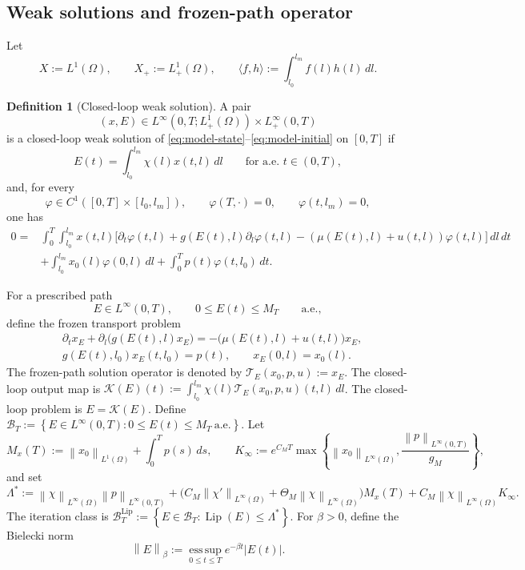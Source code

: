 \documentclass[pdflatex,sn-mathphys-num]{sn-jnl}
\theoremstyle{thmstyleone}
\theoremstyle{definition}
\newtheorem{definition}[theorem]{Definition}
\theoremstyle{remark}
\newcommand{\Om}{\Omega}
\newcommand{\Tcal}{\mathcal{T}}
\newcommand{\Kcal}{\mathcal{K}}
\newcommand{\Bt}{\mathcal{B}_T}
\newcommand{\Btl}{\mathcal{B}_T^{\mathrm{Lip}}}
\newcommand{\Lip}{\operatorname{Lip}}
\newcommand{\norm}[1]{\left\lVert#1\right\rVert}
\newcommand{\abs}[1]{\left\lvert#1\right\rvert}
\numberwithin{equation}{section}
\begin{document}
\subsection{Weak solutions and frozen-path operator}
\label{subsec:model-weak}
Let
\[
X:=L^1(\Om),
\qquad
X_+:=L^1_+(\Om),
\qquad
\langle f,h\rangle:=\int_{l_0}^{l_m}f(l)h(l)\,dl .
\]
\begin{definition}[Closed-loop weak solution]
\label{def:model-weak-solution}
A pair
\[
(x,E)\in L^\infty(0,T;L^1_+(\Omega))\times L^\infty_+(0,T)
\]
is a closed-loop weak solution of
\eqref{eq:model-state}--\eqref{eq:model-initial} on \([0,T]\) if
\[
E(t)=\int_{l_0}^{l_m}\chi(l)x(t,l)\,dl
\qquad\text{for a.e. }t\in(0,T),
\]
and, for every
\[
\varphi\in C^1([0,T]\times[l_0,l_m]),
\qquad
\varphi(T,\cdot)=0,
\qquad
\varphi(t,l_m)=0,
\]
one has
\begin{align}
0={}&
\int_0^T\int_{l_0}^{l_m}
x(t,l)
\Big[
\partial_t\varphi(t,l)
+
g(E(t),l)\partial_l\varphi(t,l)
-
(\mu(E(t),l)+u(t,l))\varphi(t,l)
\Big]\,dl\,dt
\nonumber\\
&+
\int_{l_0}^{l_m}x_0(l)\varphi(0,l)\,dl
+
\int_0^T p(t)\varphi(t,l_0)\,dt .
\label{eq:model-weak-form}
\end{align}
\end{definition}
For a prescribed path
\[
E\in L^\infty(0,T),
\qquad
0\le E(t)\le M_T\qquad\text{a.e.},
\]
define the frozen transport problem
\begin{align}
&\partial_t x_E+\partial_l\big(g(E(t),l)x_E\big)
=
-\big(\mu(E(t),l)+u(t,l)\big)x_E,
\label{eq:model-frozen-state}
\\
&g(E(t),l_0)x_E(t,l_0)=p(t),
\qquad
x_E(0,l)=x_0(l).
\label{eq:model-frozen-bc}
\end{align}
The frozen-path solution operator is denoted by
$\displaystyle \Tcal_E(x_0,p,u):=x_E$.
The closed-loop output map is
$\displaystyle \Kcal(E)(t)
:=
\int_{l_0}^{l_m}\chi(l)\Tcal_E(x_0,p,u)(t,l)\,dl$.
The closed-loop problem is
$\displaystyle  E=\Kcal(E)$.
Define
$\displaystyle \Bt:=
\left\{
E\in L^\infty(0,T):
0\le E(t)\le M_T\ \text{a.e.}
\right\}$.
Let
\[
M_x(T):=\norm{x_0}_{L^1(\Om)}+\int_0^T p(s)\,ds,
\qquad
K_\infty:=
e^{C_M T}
\max\left\{
\norm{x_0}_{L^\infty(\Om)},
\frac{\norm{p}_{L^\infty(0,T)}}{g_M}
\right\},
\]
and set
\begin{equation}
\label{eq:model-Lambdastar}
\Lambda^*:=
\norm{\chi}_{L^\infty(\Om)}\norm{p}_{L^\infty(0,T)}
+
\Big(
C_M\norm{\chi'}_{L^\infty(\Om)}
+\Theta_M\norm{\chi}_{L^\infty(\Om)}
\Big)M_x(T)
+
C_M\norm{\chi}_{L^\infty(\Om)}K_\infty .
\end{equation}
The iteration class is
$\displaystyle \Btl:=
\left\{
E\in\Bt:
\Lip(E)\le \Lambda^*
\right\}$.
For \(\beta>0\), define the Bielecki norm
\begin{equation}
\label{eq:model-Bielecki}
\norm{E}_\beta
:=
\operatorname*{ess\,sup}_{0\le t\le T}
e^{-\beta t}\abs{E(t)} .
\end{equation}
\end{document}
